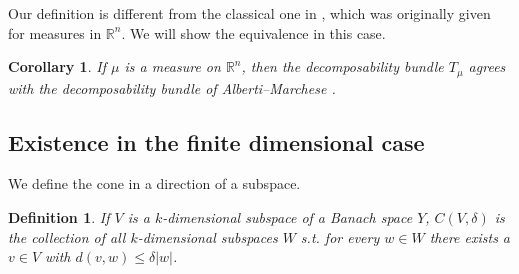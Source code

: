 \documentclass{amsart}
\newtheorem{corollary}[theorem]{Corollary}
\newtheorem{definition}[theorem]{Definition}
\newtheorem{remark}[theorem]{Remark}
\numberwithin{equation}{section}
\newcommand{\R}{\mathbb{R}}
\begin{document}
Our definition is different from the classical one in \cite{almar16}, which was originally given for measures in $\R^n$. We will show the equivalence in this case.

\begin{corollary}\label{cor:AM}
    If $\mu$ is a measure on $\R^n$, then the decomposability bundle $T_\mu$ agrees with the decomposability bundle of Alberti--Marchese \cite[Section 2.2]{almar16}.
\end{corollary}

\subsection{Existence in the finite dimensional case}

We define the cone in a direction of a subspace.
\begin{definition}\label{eq:conesubsspace} If $V$ is a $k$-dimensional subspace of a Banach space $Y$, $C(V,\delta)$ is the collection of all $k$-dimensional subspaces $W$ s.t. for every $w\in W$ there exists a $v\in V$ with $d(v,w)\leq \delta |w|$.
\end{definition}
\end{document}
